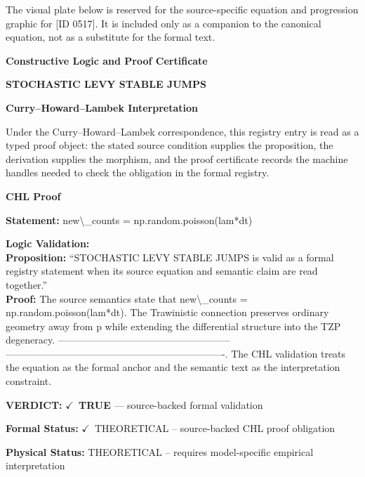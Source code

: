 \begingroup\footnotesize\sloppy
The visual plate below is reserved for the source-specific equation and progression graphic for [ID 0517]. It is included only as a companion to the canonical equation, not as a substitute for the formal text.
\par\endgroup
\ifTZPDarkEdition
{}
\fi

\clearpage
\begingroup\tzpsupportsetup
\noindent\textbf{\fontsize{10.8pt}{12.8pt}\selectfont [ID 0517] Constructive Logic and Proof Certificate}\par
\noindent\textbf{\fontsize{10pt}{12pt}\selectfont STOCHASTIC LEVY STABLE JUMPS}\par
\vspace{0.45em}
\begingroup
\footnotesize
\setlength{\parskip}{0.22em}
\setlength{\parindent}{0pt}
\noindent\textbf{Curry--Howard--Lambek Interpretation}\par
Under the Curry--Howard--Lambek correspondence, this registry entry is read as a typed proof
object: the stated source condition supplies the proposition, the derivation supplies the
morphism, and the proof certificate records the machine handles needed to check the obligation
in the formal registry.

\vspace{0.45em}
\noindent\textbf{CHL Proof}\par
\textbf{Statement:} new\textbackslash{}\_counts = np.random.poisson(lam*dt)

\textbf{Logic Validation:}\\
\textbf{Proposition:} ``STOCHASTIC LEVY STABLE JUMPS is valid as a formal registry statement when its source
equation and semantic claim are read together.''\\
\textbf{Proof:} The source semantics state that new\textbackslash{}\_counts = np.random.poisson(lam*dt). The Trawinistic
connection preserves ordinary geometry away from p while extending the differential
structure into the TZP degeneracy. -----------------------------------------------------
-------------------------------------------------------------------. The CHL validation
treats the equation as the formal anchor and the semantic text as the interpretation
constraint.

\textbf{VERDICT:} \ensuremath{\checkmark}\ \textbf{TRUE} --- source-backed formal validation

\textbf{Formal Status:} \ensuremath{\checkmark}\ THEORETICAL -- source-backed CHL proof obligation

\textbf{Physical Status:} THEORETICAL -- requires model-specific empirical interpretation
\par\vspace{0.45em}
\par
\ifTZPDarkEdition
{}
\fi
\endgroup
\endgroup
